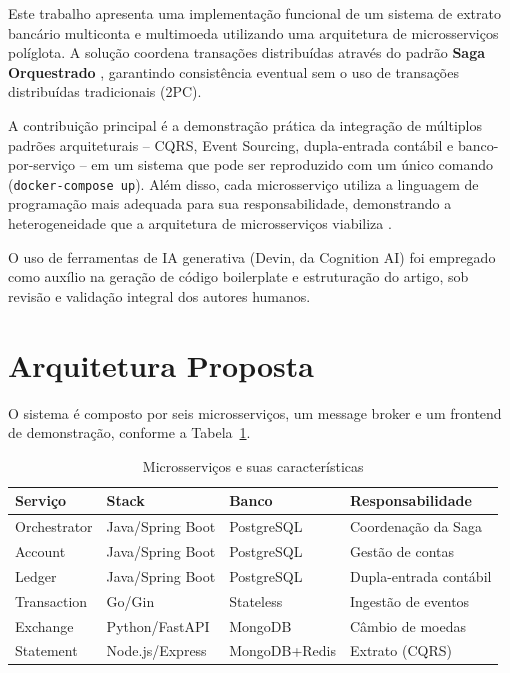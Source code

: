 \documentclass[12pt]{article}
\begin{document}
Este trabalho apresenta uma implementa\c{c}\~{a}o funcional de um sistema de extrato banc\'{a}rio multiconta e multimoeda utilizando uma arquitetura de microsservi\c{c}os pol\'{i}glota. A solu\c{c}\~{a}o coordena transa\c{c}\~{o}es distribu\'{i}das atrav\'{e}s do padr\~{a}o \textbf{Saga Orquestrado} \cite{garcia2018,richardson2018}, garantindo consist\^{e}ncia eventual sem o uso de transa\c{c}\~{o}es distribu\'{i}das tradicionais (2PC).

A contribui\c{c}\~{a}o principal \'{e} a demonstra\c{c}\~{a}o pr\'{a}tica da integra\c{c}\~{a}o de m\'{u}ltiplos padr\~{o}es arquiteturais -- CQRS, Event Sourcing, dupla-entrada cont\'{a}bil e banco-por-servi\c{c}o -- em um sistema que pode ser reproduzido com um \'{u}nico comando (\texttt{docker-compose up}). Al\'{e}m disso, cada microsservi\c{c}o utiliza a linguagem de programa\c{c}\~{a}o mais adequada para sua responsabilidade, demonstrando a heterogeneidade que a arquitetura de microsservi\c{c}os viabiliza \cite{newman2015}.

O uso de ferramentas de IA generativa (Devin, da Cognition AI) foi empregado como aux\'{i}lio na gera\c{c}\~{a}o de c\'{o}digo boilerplate e estrutura\c{c}\~{a}o do artigo, sob revis\~{a}o e valida\c{c}\~{a}o integral dos autores humanos.


\section{Arquitetura Proposta}

O sistema \'{e} composto por seis microsservi\c{c}os, um message broker e um frontend de demonstra\c{c}\~{a}o, conforme a Tabela~\ref{tab:services}.

\begin{table}[h]
\centering
\caption{Microsservi\c{c}os e suas caracter\'{i}sticas}
\label{tab:services}
\begin{tabular}{|l|l|l|l|}
\hline
\textbf{Servi\c{c}o} & \textbf{Stack} & \textbf{Banco} & \textbf{Responsabilidade} \\
\hline
Orchestrator & Java/Spring Boot & PostgreSQL & Coordena\c{c}\~{a}o da Saga \\
Account & Java/Spring Boot & PostgreSQL & Gest\~{a}o de contas \\
Ledger & Java/Spring Boot & PostgreSQL & Dupla-entrada cont\'{a}bil \\
Transaction & Go/Gin & Stateless & Ingest\~{a}o de eventos \\
Exchange & Python/FastAPI & MongoDB & C\^{a}mbio de moedas \\
Statement & Node.js/Express & MongoDB+Redis & Extrato (CQRS) \\
\hline
\end{tabular}
\end{table}
\end{document}
